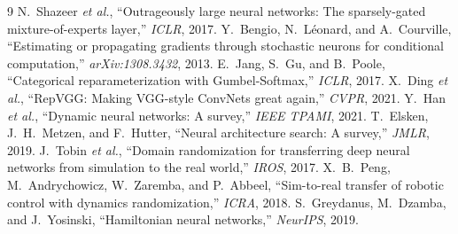 \documentclass[conference,10pt]{IEEEtran}
\begin{document}
\begin{thebibliography}{9}
 N.~Shazeer \emph{et al.}, ``Outrageously large neural networks: The sparsely-gated mixture-of-experts layer,'' \emph{ICLR}, 2017.
 Y.~Bengio, N.~L\'eonard, and A.~Courville, ``Estimating or propagating gradients through stochastic neurons for conditional computation,'' \emph{arXiv:1308.3432}, 2013.
 E.~Jang, S.~Gu, and B.~Poole, ``Categorical reparameterization with Gumbel-Softmax,'' \emph{ICLR}, 2017.
 X.~Ding \emph{et al.}, ``RepVGG: Making VGG-style ConvNets great again,'' \emph{CVPR}, 2021.
 Y.~Han \emph{et al.}, ``Dynamic neural networks: A survey,'' \emph{IEEE TPAMI}, 2021.
 T.~Elsken, J.~H.~Metzen, and F.~Hutter, ``Neural architecture search: A survey,'' \emph{JMLR}, 2019.
 J.~Tobin \emph{et al.}, ``Domain randomization for transferring deep neural networks from simulation to the real world,'' \emph{IROS}, 2017.
 X.~B.~Peng, M.~Andrychowicz, W.~Zaremba, and P.~Abbeel, ``Sim-to-real transfer of robotic control with dynamics randomization,'' \emph{ICRA}, 2018.
 S.~Greydanus, M.~Dzamba, and J.~Yosinski, ``Hamiltonian neural networks,'' \emph{NeurIPS}, 2019.
\end{thebibliography}
\end{document}
